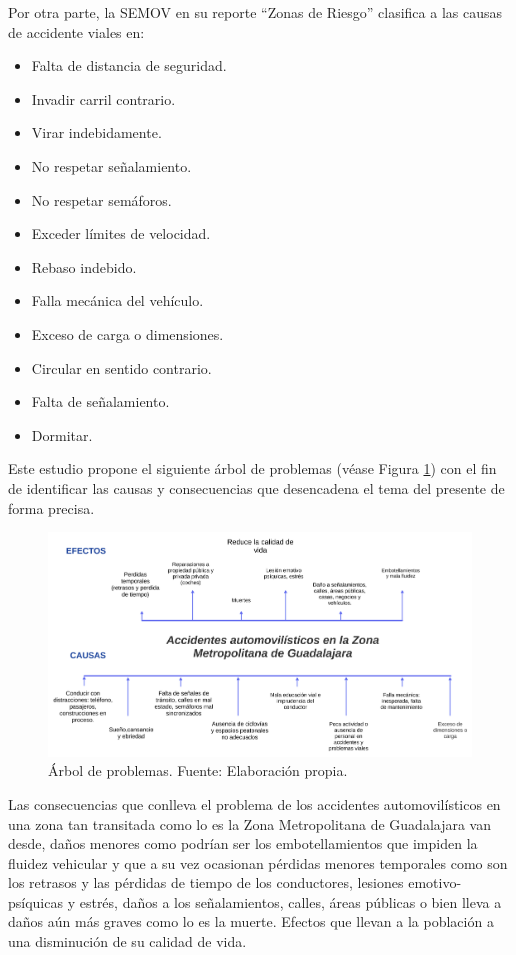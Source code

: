 \documentclass{article}
\begin{document}
Por otra parte, la SEMOV en su reporte ``Zonas de Riesgo'' clasifica a las causas de accidente viales en:

	\begin{itemize}
		\item Falta de distancia de seguridad.
		\item Invadir carril contrario.
		\item Virar indebidamente.
		\item No respetar señalamiento.
		\item No respetar semáforos.
		\item Exceder límites de velocidad.
		\item Rebaso indebido.
		\item Falla mecánica del vehículo.
		\item Exceso de carga o dimensiones.
		\item Circular en sentido contrario.
		\item Falta de señalamiento.
		\item Dormitar.
	\end{itemize}


Este estudio propone el siguiente árbol de problemas (véase Figura \ref{fig:arbol}) con el fin de identificar las causas y consecuencias que desencadena el tema del presente de forma precisa.


	\begin{figure}[H]\centering
	\includegraphics[width=1\textwidth]{resources/img/arbol_de_problemas.png}
	\caption{\label{fig:arbol} Árbol de problemas. Fuente: Elaboración propia.}
    \end{figure}

Las consecuencias que conlleva el problema de los accidentes automovilísticos en una zona tan transitada como lo es la Zona Metropolitana de Guadalajara van desde, daños menores como podrían ser los embotellamientos que impiden la fluidez vehicular y que a su vez ocasionan pérdidas menores temporales como son los retrasos y las pérdidas de tiempo de los conductores, lesiones emotivo-psíquicas y estrés, daños a los señalamientos, calles, áreas públicas o bien lleva a daños aún más graves como lo es la muerte. Efectos que llevan a la población a una disminución de su calidad de vida.
\end{document}
